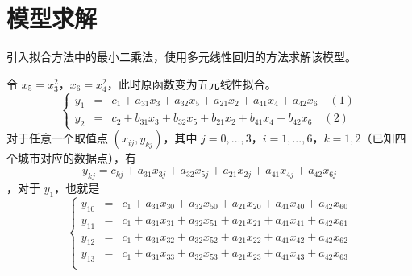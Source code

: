 \documentclass[UTF8]{ctexart}
\begin{document}
\section{模型求解}

引入拟合方法中的最小二乘法，使用多元线性回归的方法求解该模型。

令 $x_5 = x_3^2$，$x_6 = x_4^2$，此时原函数变为五元线性拟合。
$$
\left\{
\begin{array}{rcl}
y_1 & = & c_1 + a_{31}x_3 + a_{32}x_5 + a_{21}x_2 + a_{41}x_4 + a_{42}x_6\quad(1) \\
y_2 & = & c_2 + b_{31}x_3 + b_{32}x_5 + b_{21}x_2 + b_{41}x_4 + b_{42}x_6\quad(2)
\end{array}
\right.
$$
对于任意一个取值点 $(x_{ij}, y_{kj})$，其中 $j = 0, ..., 3$，$i = 1, ..., 6$，$k = 1, 2$（已知四个城市对应的数据点），有
$$y_{kj} = c_{kj} + a_{31}x_{3j} + a_{32}x_{5j} + a_{21}x_{2j} + a_{41}x_{4j} + a_{42}x_{6j}$$
，对于 $y_1$，也就是
$$
\left\{
\begin{array}{rcl}
y_{10} & = & c_1 + a_{31}x_{30} + a_{32}x_{50} + a_{21}x_{20} + a_{41}x_{40} + a_{42}x_{60} \\
y_{11} & = & c_1 + a_{31}x_{31} + a_{32}x_{51} + a_{21}x_{21} + a_{41}x_{41} + a_{42}x_{61} \\
y_{12} & = & c_1 + a_{31}x_{32} + a_{32}x_{52} + a_{21}x_{22} + a_{41}x_{42} + a_{42}x_{62} \\
y_{13} & = & c_1 + a_{31}x_{33} + a_{32}x_{53} + a_{21}x_{23} + a_{41}x_{43} + a_{42}x_{63} \\
\end{array}
\right.
$$
\end{document}

